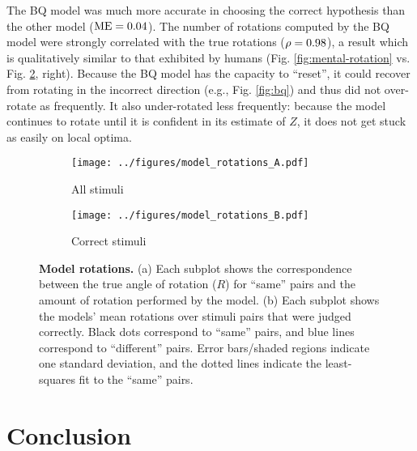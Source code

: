 \documentclass{article} %
\begin{document}
The BQ model was much more accurate in choosing the correct hypothesis
than the other model ($\mathrm{ME}{}=0.04{}$). The number of rotations computed by
the BQ model were strongly correlated with the true rotations
($\rho=0.98$), a result which is qualitatively similar to that exhibited
by humans (Fig. \ref{fig:mental-rotation}
vs. Fig. \ref{fig:correct-stimuli}, right). Because the BQ model has
the capacity to ``reset'', it could recover from rotating in the
incorrect direction (e.g., Fig. \ref{fig:bq}) and thus did not
over-rotate as frequently.  It also under-rotated less frequently:
because the model continues to rotate until it is confident in its
estimate of $Z$, it does not get stuck as easily on local optima.

\begin{figure}[t]
  \centering
  \begin{subfigure}[b]{0.49\textwidth}
    \centering
    \texttt{[image: ../figures/model\_rotations\_A.pdf]}
    \caption{All stimuli}
    \label{fig:all-stimuli}
  \end{subfigure}
  \begin{subfigure}[b]{0.49\textwidth}
    \centering
    \texttt{[image: ../figures/model\_rotations\_B.pdf]}
    \caption{Correct stimuli}
    \label{fig:correct-stimuli}
  \end{subfigure}
  \caption{\textbf{Model rotations.} (a) Each subplot shows the
    correspondence between the true angle of rotation ($R$) for
    ``same'' pairs and the amount of rotation performed by the
    model. (b) Each subplot shows the models' mean rotations over
    stimuli pairs that were judged correctly. Black dots correspond to
    ``same'' pairs, and blue lines correspond to ``different''
    pairs. Error bars/shaded regions indicate one standard deviation,
    and the dotted lines indicate the least-squares fit to the
    ``same'' pairs.}
  \label{fig:rotations}
\end{figure}


\section{Conclusion}
\end{document}
